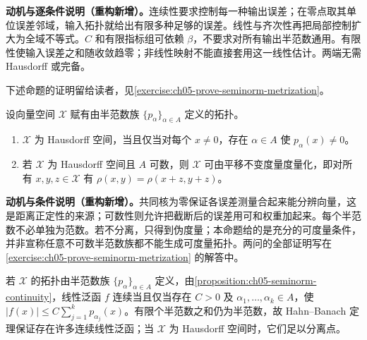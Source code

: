 \documentclass[../../main.tex]{subfiles}
\begin{document}
\begin{remark}
\textbf{动机与逐条件说明（重构新增）。}连续性要求控制每一种输出误差；在零点取其单位误差邻域，输入拓扑就给出有限多种足够的误差。线性与齐次性再把局部控制扩大为全域不等式。$C$ 和有限指标组可依赖 $\beta$，不要求对所有输出半范数通用。有限性使输入误差之和随收敛趋零；非线性映射不能直接套用这一线性估计。两端无需 Hausdorff 或完备。
\end{remark}
下述命题的证明留给读者，见\cref{exercise:ch05-prove-seminorm-metrization}。
\begin{proposition}\label{proposition:ch05-seminorm-metrization}
设向量空间 $\mathcal X$ 赋有由半范数族 $\{p_\alpha\}_{\alpha\in A}$ 定义的拓扑。
\begin{enumerate}
\item\label{item:ch05-seminorm-hausdorff} $\mathcal X$ 为 Hausdorff 空间，当且仅当对每个 $x\ne0$，存在 $\alpha\in A$ 使 $p_\alpha(x)\ne0$。
\item\label{item:ch05-seminorm-metrizable} 若 $\mathcal X$ 为 Hausdorff 空间且 $A$ 可数，则 $\mathcal X$ 可由平移不变度量度量化，即对所有 $x,y,z\in\mathcal X$ 有 $\rho(x,y)=\rho(x+z,y+z)$。
\end{enumerate}
\end{proposition}
\begin{remark}
\textbf{动机与条件说明（重构新增）。}共同核为零保证各误差测量合起来能分辨向量，这是距离正定性的来源；可数性则允许把截断后的误差用可和权重加起来。每个半范数不必单独为范数。若不分离，只得到伪度量；本命题给的是充分的可度量条件，并非宣称任意不可数半范数族都不能生成可度量拓扑。两问的全部证明写在\cref{exercise:ch05-prove-seminorm-metrization} 的解答中。
\end{remark}
若 $\mathcal X$ 的拓扑由半范数族 $\{p_\alpha\}_{\alpha\in A}$ 定义，由\cref{proposition:ch05-seminorm-continuity}，线性泛函 $f$ 连续当且仅当存在 $C>0$ 及 $\alpha_1,\ldots,\alpha_k\in A$，使 $|f(x)|\le C\sum_{j=1}^kp_{\alpha_j}(x)$。有限个半范数之和仍为半范数，故 Hahn--Banach 定理保证存在许多连续线性泛函；当 $\mathcal X$ 为 Hausdorff 空间时，它们足以分离点。
\end{document}
